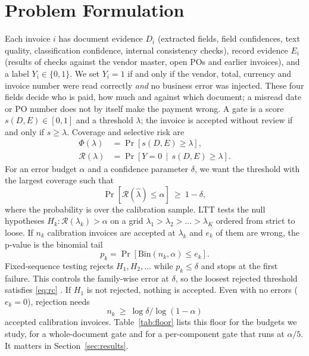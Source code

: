 \documentclass[conference]{IEEEtran}
\begin{document}
\section{Problem Formulation}\label{sec:problem}
Each invoice $i$ has document evidence $D_i$ (extracted fields, field
confidences, text quality, classification confidence, internal consistency
checks), record evidence $E_i$ (results of checks against the vendor master,
open POs and earlier invoices), and a label $Y_i\in\{0,1\}$. We set $Y_i=1$ if
and only if the vendor, total, currency and invoice number were read correctly
\emph{and} no business error was injected. These four fields decide who is
paid, how much and against which document; a misread date or PO number does not by itself
make the payment wrong. A gate is a score $s(D,E)\in[0,1]$ and a threshold
$\lambda$; the invoice is accepted without review if and only if $s\ge\lambda$.
Coverage and selective risk are
\begin{align}
\Phi(\lambda) &= \Pr\!\left[s(D,E)\ge\lambda\right],\label{eq:cov}\\
\mathcal{R}(\lambda) &= \Pr\!\left[Y=0 \,\middle|\, s(D,E)\ge\lambda\right].\label{eq:risk}
\end{align}
For an error budget $\alpha$ and a confidence parameter $\delta$, we want the
threshold with the largest coverage such that
\begin{equation}
\Pr\!\left[\mathcal{R}(\hat\lambda)\le\alpha\right]\ \ge\ 1-\delta,
\label{eq:rc}
\end{equation}
where the probability is over the calibration sample. LTT tests the null
hypotheses $H_k:\mathcal{R}(\lambda_k)>\alpha$ on a grid
$\lambda_1>\lambda_2>\dots>\lambda_K$ ordered from strict to loose. If $n_k$
calibration invoices are accepted at $\lambda_k$ and $e_k$ of them are wrong,
the p-value is the binomial tail
\begin{equation}
p_k=\Pr\!\left[\mathrm{Bin}(n_k,\alpha)\le e_k\right].
\label{eq:pval}
\end{equation}
Fixed-sequence testing rejects $H_1,H_2,\dots$ while $p_k\le\delta$ and stops at
the first failure. This controls the family-wise error at $\delta$, so the
loosest rejected threshold satisfies \eqref{eq:rc} \cite{angelopoulos2025ltt}.
If $H_1$ is not rejected, nothing is accepted. Even with no errors ($e_k=0$),
rejection needs
\begin{equation}
n_k\ \ge\ \log\delta/\log(1-\alpha)
\label{eq:floor}
\end{equation}
accepted calibration invoices. Table~\ref{tab:floor} lists this floor for the
budgets we study, for a whole-document gate and for a per-component gate that
runs at $\alpha/5$. It matters in Section~\ref{sec:results}.
\end{document}
